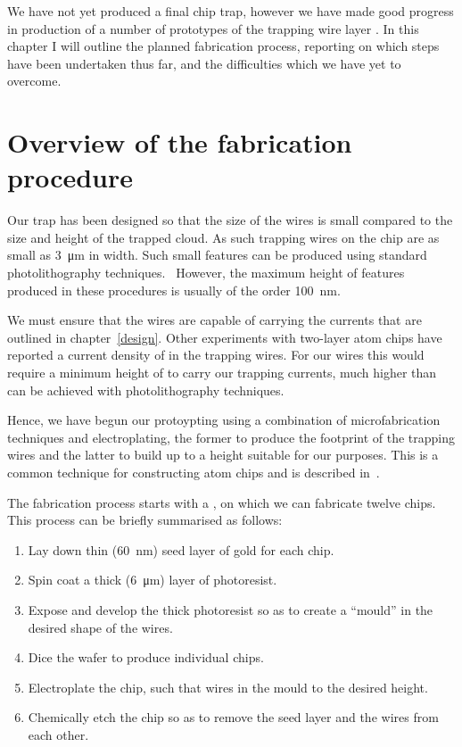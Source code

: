 We have not yet produced a final chip trap, however we have made good progress
in production of a number of prototypes of the trapping wire layer . In this chapter I will outline the
planned fabrication process, reporting on which steps have been undertaken thus
far, and the difficulties which we have yet to overcome.

\section{Overview of the fabrication procedure}

Our trap has been designed so that the size of the wires is small compared to
the size and height of the trapped cloud. As such trapping wires on the chip
are as small as \SI{3}{\micro\meter} in width. Such small features can be
produced using standard photolithography techniques.~\cite{Madou2002} However,
the maximum height of features produced in these procedures is usually of the
order \SI{100}{\nano\meter}.

We must ensure that the wires are capable of carrying the currents that are
outlined in chapter~\ref{design}.  Other experiments with two-layer atom chips
have reported a current density of  in the trapping wires. For our wires
this would require a minimum height of  to carry our trapping
currents, much higher than can be achieved with photolithography techniques.

Hence, we have begun our protoypting using a combination of microfabrication
techniques and electroplating, the former to produce the footprint of the
trapping wires and the latter to build up to a height suitable for our
purposes. This is a common technique for constructing atom chips and is
described in~\cite{2011Ac, Lev2003}.

The fabrication process starts with a ,
on which we can fabricate twelve  chips. This process can be
briefly summarised as follows:
\begin{enumerate}
\item Lay down thin (\SI{60}{\nano\meter}) seed layer of gold for each chip.
\item Spin coat a thick (\SI{6}{\micro\meter}) layer of photoresist.
\item Expose and develop the thick photoresist so as to create a ``mould''
in the desired shape of the wires.
\item Dice the wafer to produce individual chips.
\item Electroplate the chip, such that wires  in the mould to the
desired height.
\item Chemically etch the chip so as to remove the seed layer and
   the wires from each other.
\end{enumerate}

